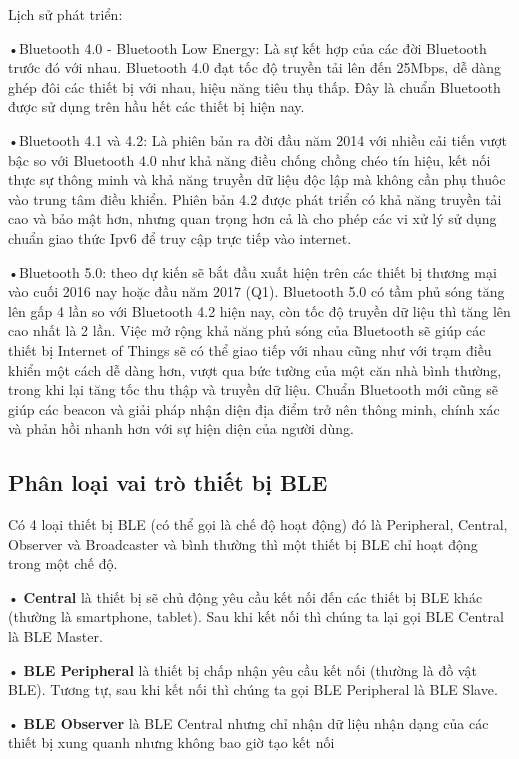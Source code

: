 Lịch sử phát triển:

•Bluetooth 4.0 - Bluetooth Low Energy: Là sự kết hợp của các đời Bluetooth trước đó với nhau. Bluetooth 4.0 đạt tốc độ truyền tải lên đến 25Mbps, dễ dàng ghép đôi các thiết bị với nhau, hiệu năng tiêu thụ thấp. Đây là chuẩn Bluetooth được sử dụng trên hầu hết các thiết bị hiện nay.

•Bluetooth 4.1 và 4.2: Là phiên bản ra đời đầu năm 2014 với nhiều cải tiến vượt bậc so với Bluetooth 4.0 như khả năng điều chống chồng chéo tín hiệu, kết nối thực sự thông minh và khả năng truyền dữ liệu độc lập mà không cần phụ thuôc vào trung tâm điều khiển. Phiên bản 4.2 được phát triển có khả năng truyền tải cao và bảo mật hơn, nhưng quan trọng hơn cả là cho phép các vi xử lý sử dụng chuẩn giao thức Ipv6 để truy cập trực tiếp vào internet.

•Bluetooth 5.0: theo dự kiến sẽ bắt đầu xuất hiện trên các thiết bị thương mại vào cuối 2016 nay hoặc đầu năm 2017 (Q1). Bluetooth 5.0 có tầm phủ sóng tăng lên gấp 4 lần so với Bluetooth 4.2 hiện nay, còn tốc độ truyền dữ liệu thì tăng lên cao nhất là 2 lần. Việc mở rộng khả năng phủ sóng của Bluetooth sẽ giúp các thiết bị Internet of Things sẽ có thể giao tiếp với nhau cũng như với trạm điều khiển một cách dễ dàng hơn, vượt qua bức tường của một căn nhà bình thường, trong khi lại tăng tốc thu thập và truyền dữ liệu. Chuẩn Bluetooth mới cũng sẽ giúp các beacon và giải pháp nhận diện địa điểm trở nên thông minh, chính xác và phản hồi nhanh hơn với sự hiện diện của người dùng.

\subsection{Phân loại vai trò thiết bị BLE}
Có 4 loại thiết bị BLE (có thể gọi là chế độ hoạt động) đó là Peripheral, Central, Observer và Broadcaster và bình thường thì một thiết bị BLE chỉ hoạt động  trong một chế độ.

• \textbf{Central} là thiết bị sẽ chủ động yêu cầu kết nối đến các thiết bị BLE khác (thường là smartphone, tablet). Sau khi kết nối thì chúng ta lại gọi BLE Central là  BLE Master.

• \textbf{BLE Peripheral} là thiết bị chấp nhận yêu cầu kết nối (thường là đồ vật BLE). Tương tự, sau khi kết nối thì chúng ta gọi BLE Peripheral là BLE Slave.

• \textbf{BLE Observer} là BLE Central nhưng chỉ nhận dữ liệu nhận dạng của các thiết bị xung quanh nhưng không bao giờ tạo kết nối


